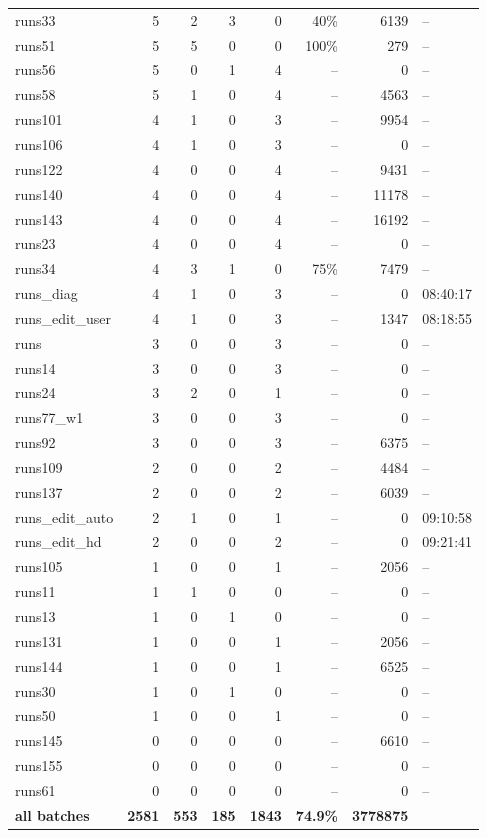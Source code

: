 \begin{longtable}{@{}lrrrrrrl@{}}
runs33 & 5 & 2 & 3 & 0 & 40\% & 6139 & -- \\
runs51 & 5 & 5 & 0 & 0 & 100\% & 279 & -- \\
runs56 & 5 & 0 & 1 & 4 & -- & 0 & -- \\
runs58 & 5 & 1 & 0 & 4 & -- & 4563 & -- \\
runs101 & 4 & 1 & 0 & 3 & -- & 9954 & -- \\
runs106 & 4 & 1 & 0 & 3 & -- & 0 & -- \\
runs122 & 4 & 0 & 0 & 4 & -- & 9431 & -- \\
runs140 & 4 & 0 & 0 & 4 & -- & 11178 & -- \\
runs143 & 4 & 0 & 0 & 4 & -- & 16192 & -- \\
runs23 & 4 & 0 & 0 & 4 & -- & 0 & -- \\
runs34 & 4 & 3 & 1 & 0 & 75\% & 7479 & -- \\
runs\_diag & 4 & 1 & 0 & 3 & -- & 0 & 08:40:17 \\
runs\_edit\_user & 4 & 1 & 0 & 3 & -- & 1347 & 08:18:55 \\
runs & 3 & 0 & 0 & 3 & -- & 0 & -- \\
runs14 & 3 & 0 & 0 & 3 & -- & 0 & -- \\
runs24 & 3 & 2 & 0 & 1 & -- & 0 & -- \\
runs77\_w1 & 3 & 0 & 0 & 3 & -- & 0 & -- \\
runs92 & 3 & 0 & 0 & 3 & -- & 6375 & -- \\
runs109 & 2 & 0 & 0 & 2 & -- & 4484 & -- \\
runs137 & 2 & 0 & 0 & 2 & -- & 6039 & -- \\
runs\_edit\_auto & 2 & 1 & 0 & 1 & -- & 0 & 09:10:58 \\
runs\_edit\_hd & 2 & 0 & 0 & 2 & -- & 0 & 09:21:41 \\
runs105 & 1 & 0 & 0 & 1 & -- & 2056 & -- \\
runs11 & 1 & 1 & 0 & 0 & -- & 0 & -- \\
runs13 & 1 & 0 & 1 & 0 & -- & 0 & -- \\
runs131 & 1 & 0 & 0 & 1 & -- & 2056 & -- \\
runs144 & 1 & 0 & 0 & 1 & -- & 6525 & -- \\
runs30 & 1 & 0 & 1 & 0 & -- & 0 & -- \\
runs50 & 1 & 0 & 0 & 1 & -- & 0 & -- \\
runs145 & 0 & 0 & 0 & 0 & -- & 6610 & -- \\
runs155 & 0 & 0 & 0 & 0 & -- & 0 & -- \\
runs61 & 0 & 0 & 0 & 0 & -- & 0 & -- \\
\midrule
\textbf{all batches} & \textbf{2581} & \textbf{553} & \textbf{185} & \textbf{1843} & \textbf{74.9\%} & \textbf{3778875} & \\
\end{longtable}
